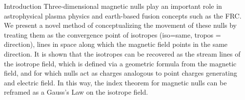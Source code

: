 \documentclass[final]{beamer}
\newlength{\onecolwid}
\begin{document}
\begin{frame}[t]
\begin{columns}[t]
\begin{column}{\onecolwid} %

\begin{block}{\huge{Introduction}}
	Three-dimensional magnetic nulls play an important role in astrophysical
	plasma physics and earth-based fusion concepts such as the FRC. 
	We present a novel method of conceptualizing the movement of these nulls by treating
        them as the convergence point of isotropes (iso=same, tropos = direction), lines in space
	along which the magnetic field points in the same direction. 
	It is shown that the isotropes can be recovered as the stream lines of
	the isotrope field, which is defined via a geometric formula from the
	magnetic field, and for which nulls act as charges analogous to point charges generating
        and electric field. In this way, the index theorem for magnetic nulls can be reframed as a Gauss's Law
        on the isotrope field. 
	
\end{block}


\end{column}
\end{columns}
\end{frame}
\end{document}
